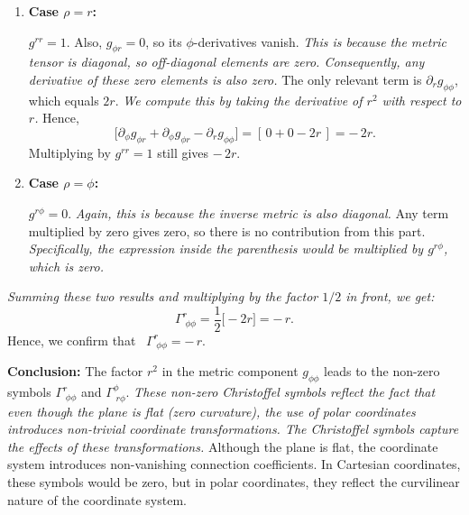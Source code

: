 \documentclass{article}
\begin{document}
\begin{enumerate}
\item \textbf{Case \(\rho = r\):}

\(g^{r r} = 1\). Also, \(g_{\phi r} = 0\), so its \(\phi\)-derivatives vanish. \emph{This is because the metric tensor is diagonal, so off-diagonal elements are zero. Consequently, any derivative of these zero elements is also zero.} The only relevant term is \(\partial_r g_{\phi\phi}\), which equals \(2r\). \emph{We compute this by taking the derivative of \(r^2\) with respect to \(r\).} Hence,
\[
\bigl[\partial_\phi g_{\phi r} + \partial_\phi g_{\phi r} - \partial_r g_{\phi\phi}\bigr]
= 
[\,0 + 0 - 2r\,]
= -\,2r.
\]
Multiplying by \(g^{rr} = 1\) still gives \(-\,2r\).

\item \textbf{Case \(\rho = \phi\):}

\(g^{r\phi} = 0\). \emph{Again, this is because the inverse metric is also diagonal.} Any term multiplied by zero gives zero, so there is no contribution from this part. \emph{Specifically, the expression inside the parenthesis would be multiplied by \(g^{r\phi}\), which is zero.}
\end{enumerate}

\emph{Summing these two results and multiplying by the factor \(1/2\) in front, we get:}
\[
\Gamma^r_{\;\phi\phi}
=
\frac12 \bigl[-2r\bigr]
=
-\,r.
\]
Hence, we confirm that 
\(\boxed{\Gamma^r_{\;\phi\phi} = -\,r}.\)

\bigskip

\textbf{Conclusion:} The factor \(r^2\) in the metric component \(g_{\phi\phi}\) leads to the non-zero symbols \(\Gamma^r_{\;\phi\phi}\) and \(\Gamma^\phi_{\;r\phi}\). \emph{These non-zero Christoffel symbols reflect the fact that even though the plane is flat (zero curvature), the use of polar coordinates introduces non-trivial coordinate transformations. The Christoffel symbols capture the effects of these transformations.} Although the plane is flat, the coordinate system introduces non-vanishing connection coefficients. In Cartesian coordinates, these symbols would be zero, but in polar coordinates, they reflect the curvilinear nature of the coordinate system.
\end{document}
